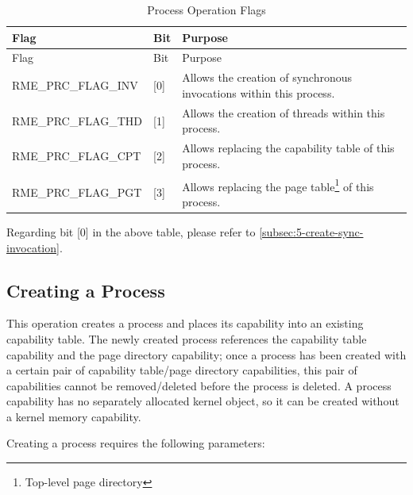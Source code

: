 \begin{xltabular}{\textwidth}{@{}>{\hsize\raggedright\arraybackslash}X>{\hsize\raggedright\arraybackslash}X>{\hsize\raggedright\arraybackslash}X@{}}
\caption{Process Operation Flags}\label{tab:4-9-process-operation-flags}\\
\toprule
Flag & Bit & Purpose\tabularnewline
\endfirsthead
\toprule
Flag & Bit & Purpose\tabularnewline
\midrule
\endhead
\bottomrule
\endlastfoot
RME\_PRC\_FLAG\_INV & {[}0{]} &
Allows the creation of synchronous invocations within this process.\tabularnewline
RME\_PRC\_FLAG\_THD & {[}1{]} & Allows the creation of threads within this process.\tabularnewline
RME\_PRC\_FLAG\_CPT & {[}2{]} & Allows replacing the capability table of this process.\tabularnewline
RME\_PRC\_FLAG\_PGT & {[}3{]} &
Allows replacing the page table\footnote{Top-level page directory} of this process.\tabularnewline
\end{xltabular}
\nopagebreak[4]

Regarding bit {[}0{]} in the above table, please refer to \ref{subsec:5-create-sync-invocation}.

\subsection{Creating a Process}\label{subsec:4-create-a-process}

This operation creates a process and places its capability into an existing capability table. The newly created process references the capability table capability and the page directory capability; once a process has been created with a certain pair of capability table/page directory capabilities, this pair of capabilities cannot be removed/deleted before the process is deleted. A process capability has no separately allocated kernel object, so it can be created without a kernel memory capability.

Creating a process requires the following parameters:

